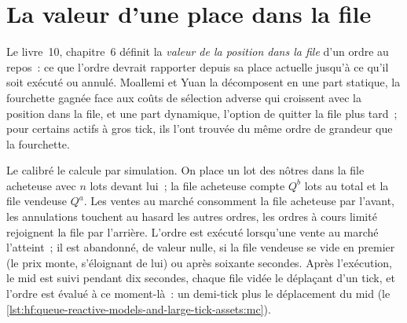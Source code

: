 \begin{omfigure}

\label{fig:hf:queue-reactive-models-and-large-tick-assets:intensities}
\end{omfigure}

\section{La valeur d'une place dans la file}

Le livre~10, chapitre~6 définit la \emph{valeur de la position dans la file} d'un ordre au repos~: ce que l'ordre devrait rapporter depuis sa place actuelle jusqu'à ce
qu'il soit exécuté ou annulé. Moallemi et Yuan la décomposent en une part statique, la fourchette gagnée face aux coûts de sélection adverse qui croissent avec la
position dans la file, et une part dynamique, l'option de quitter la file plus tard~; pour certains actifs à gros tick, ils l'ont trouvée du même ordre de grandeur que la fourchette.

Le  calibré le calcule par simulation. On place un lot des nôtres dans la file acheteuse avec $n$ lots devant lui~; la file acheteuse compte $Q^b$
lots au total et la file vendeuse $Q^a$. Les ventes au marché consomment la file acheteuse par l'avant, les annulations touchent au hasard les autres ordres, les ordres à cours limité rejoignent la
file par l'arrière. L'ordre est exécuté lorsqu'une vente au marché l'atteint~; il est abandonné, de valeur nulle, si la file vendeuse se vide en premier (le prix monte, s'éloignant
de lui) ou après soixante secondes. Après l'exécution, le mid est suivi pendant dix secondes, chaque file vidée le déplaçant d'un tick, et l'ordre est évalué
à ce moment-là~: un demi-tick plus le déplacement du mid (le \cref{lst:hf:queue-reactive-models-and-large-tick-assets:mc}).

